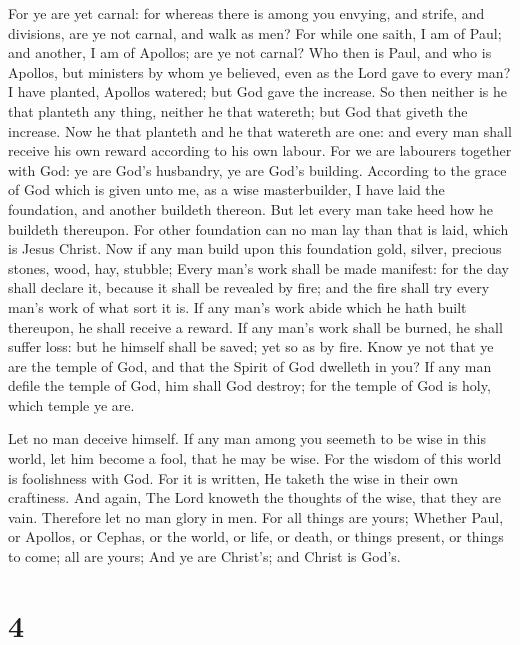  For ye are yet carnal: for whereas there is among you
envying, and strife, and divisions, are ye not carnal, and walk as men?
 For while one saith, I am of Paul; and another, I am of
Apollos; are ye not carnal?  Who then is Paul, and who is
Apollos, but ministers by whom ye believed, even as the Lord gave to
every man?  I have planted, Apollos watered; but God gave
the increase.  So then neither is he that planteth any
thing, neither he that watereth; but God that giveth the increase.
 Now he that planteth and he that watereth are one: and
every man shall receive his own reward according to his own labour.
 For we are labourers together with God: ye are God's
husbandry, ye are God's building.  According to the grace
of God which is given unto me, as a wise masterbuilder, I have laid the
foundation, and another buildeth thereon. But let every man take heed
how he buildeth thereupon.  For other foundation can no
man lay than that is laid, which is Jesus Christ.  Now if
any man build upon this foundation gold, silver, precious stones, wood,
hay, stubble;  Every man's work shall be made manifest:
for the day shall declare it, because it shall be revealed by fire; and
the fire shall try every man's work of what sort it is. 
If any man's work abide which he hath built thereupon, he shall receive
a reward.  If any man's work shall be burned, he shall
suffer loss: but he himself shall be saved; yet so as by fire.
 Know ye not that ye are the temple of God, and that the
Spirit of God dwelleth in you?  If any man defile the
temple of God, him shall God destroy; for the temple of God is holy,
which temple ye are.

 Let no man deceive himself. If any man among you seemeth
to be wise in this world, let him become a fool, that he may be wise.
 For the wisdom of this world is foolishness with God.
For it is written, He taketh the wise in their own craftiness.
 And again, The Lord knoweth the thoughts of the wise,
that they are vain.  Therefore let no man glory in men.
For all things are yours;  Whether Paul, or Apollos, or
Cephas, or the world, or life, or death, or things present, or things to
come; all are yours;  And ye are Christ's; and Christ is
God's.

\hypertarget{section-3}{%
\section{4}\label{section-3}}

